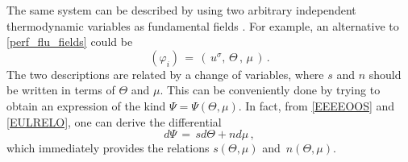 \documentclass[a4paper, amsfonts, amssymb, amsmath, reprint, twocolumn, showkeys, nofootinbib]{revtex4-2}
\begin{document}
The same system can be described by using two arbitrary  independent thermodynamic variables as fundamental fields \citep{MTW_book}. 
For example, an alternative to \eqref{perf_flu_fields} could be \citep{Kovtun2019}
\begin{equation}\label{kovtunN}
(\varphi_i) \, = \, ( \,  u^\sigma, \,  \Theta\,  ,\,  \mu\,  ) \,  .
\end{equation}
The two descriptions are related by a change of variables, where $s$ and $n$ should be written in terms of $\Theta$ and $\mu$. This can be conveniently done by trying to obtain an expression of the kind $\Psi = \Psi (\Theta,\mu)$. 
In fact, from \eqref{EEEEOOS} and \eqref{EULRELO}, one can derive the differential
\begin{equation}
\label{JonasIlBriccone}
d\Psi \, = \, s d\Theta + n d\mu \, ,
\end{equation}
which immediately provides the relations $s(\Theta,\mu)$ and~$n(\Theta,\mu)$.
\end{document}
